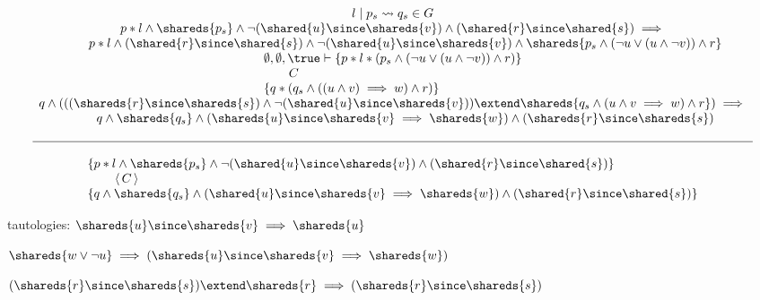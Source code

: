 \[
\begin{array}{c}
  l \mid p_s \leadsto q_s \in G
  \\
  p*l \land \shareds{p_s} 
  \land 
  \neg (\shared{u} \since \shareds{v}) 
  \land (\shared{r} \since \shared{s}) \implies\\
  \qquad
  p*l 
  \land 
  (\shared{r} \since \shared{s}) 
  \land 
  \neg (\shared{u} \since \shareds{v})
  \land
  \shareds{p_s \land (\neg u \lor (u \land \neg v)) \land r}
  \\
  \begin{array}{l}
  \emptyset,\emptyset,\true \vdash \{p*l *(p_s 
  \land 
  (\neg  u \lor ( u \land \neg v)) 
  \land r) \}
  \\
  \qquad  C 
  \\
  \{q * 
  (q_s
  \land 
  (( u  \land  v) \implies w)
  \land 
  r) \}
  \end{array}
\\
q \land (((\shareds{r} \since \shareds{s}) \land \neg (\shared{u} \since \shareds{v})) 
  \extend \shareds{q_s \land (u \land v \implies w) \land r})
\implies\\
\qquad
q \land \shareds{q_s} \land 
(\shareds{u} \since \shareds{v} \implies \shareds{w}) \land
(\shareds{r} \since \shareds{s})
\\
\\
\hline
\\
\begin{array}{l}
\{p*l \land \shareds{p_s} 
\land 
\neg (\shared{u} \since \shareds{v}) 
\land (\shared{r} \since \shared{s}) \}
\\
\qquad \,\langle\, C \,\rangle\,
\\
\{q \land \shareds{q_s} 
\land 
(\shared{u} \since \shareds{v} \implies \shareds{w}) 
\land (\shared{r} \since \shared{s}) \}
\end{array}
\end{array}
\]


tautologies:
$\shareds{u} \since \shareds{v} \implies \shareds{u}$

$ \shareds{w \lor \neg u}
\implies
(\shareds{u} \since \shareds{v} \implies \shareds{w})$

$ (\shareds{r} \since \shareds{s}) 
\extend
\shareds{r}
\implies
(\shareds{r} \since \shareds{s})$







